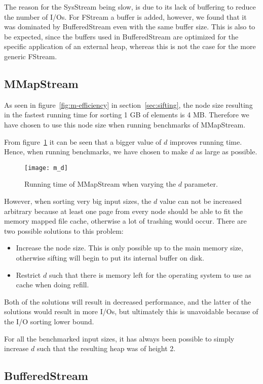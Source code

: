 The reason for the SysStream being slow, is due to its lack of buffering to reduce the number of I/Os. For FStream a buffer is added, however, we found that it was dominated by BufferedStream even with the same buffer size. This is also to be expected, since the buffers used in BufferedStream are optimized for the specific application of an external heap, whereas this is not the case for the more generic FStream.

\subsection{MMapStream}
As seen in figure~\ref{fig:m-efficiency} in section~\ref{sec:sifting}, the node size resulting in the fastest running time for sorting 1 GB of elements is 4 MB. Therefore we have chosen to use this node size when running benchmarks of MMapStream.

From figure~\ref{fig:m:vary-d} it can be seen that a bigger value of $d$ improves running time. Hence, when running benchmarks, we have chosen to make $d$ as large as possible. 

\begin{figure}[h!]
  \centering
  \texttt{[image: m\_d]}
  \caption{Running time of MMapStream when varying the $d$ parameter.}
  \label{fig:m:vary-d}
\end{figure}

However, when sorting very big input sizes, the $d$ value can not be increased arbitrary because at least one page from every node should be able to fit the memory mapped file cache, otherwise a lot of trashing would occur. There are two possible solutions to this problem:
\begin{itemize}
\item Increase the node size. This is only possible up to the main memory size, otherwise sifting will begin to put its internal buffer on disk.
\item Restrict $d$ such that there is memory left for the operating system to use as cache when doing refill.
\end{itemize}
Both of the solutions will result in decreased performance, and the latter of the solutions would result in more I/Os, but ultimately this is unavoidable because of the I/O sorting lower bound.

For all the benchmarked input sizes, it has always been possible to simply increase $d$ such that the resulting heap was of height 2.

\subsection{BufferedStream}

